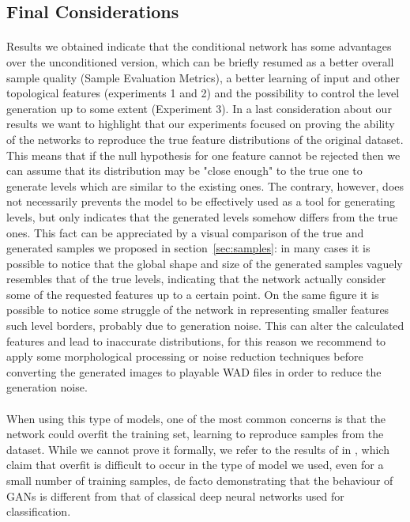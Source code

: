  
\subsection{Final Considerations}
\paragraph{} Results we obtained indicate that the conditional network has some advantages over the unconditioned version, which can be briefly resumed as a better overall sample quality (Sample Evaluation Metrics), a better learning of input and other topological features (experiments 1 and 2) and the possibility to control the level generation up to some extent (Experiment 3). In a last consideration about our results we want to highlight that our experiments focused on proving the ability of the networks to reproduce the true feature distributions of the original dataset. This means that if the null hypothesis for one feature cannot be rejected then we can assume that its distribution may be "close enough" to the true one to generate levels which are similar to the existing ones. The contrary, however, does not necessarily prevents the model to be effectively used as a tool for generating levels, but only indicates that the generated levels somehow differs from the true ones. This fact can be appreciated by a visual comparison of the true and generated samples we proposed in section~\ref{sec:samples}: in many cases it is possible to notice that the global shape and size of the generated samples vaguely resembles that of the true levels, indicating that the network actually consider some of the requested features up to a certain point. On the same figure it is possible to notice some struggle of the network in representing smaller features such level borders, probably due to generation noise. This can alter the calculated features and lead to inaccurate distributions, for this reason we recommend to apply some morphological processing or noise reduction techniques before converting the generated images to playable WAD files in order to reduce the generation noise.

\paragraph{} When using this type of models, one of the most common concerns is that the network could overfit the training set, learning to reproduce samples from the dataset. While we cannot prove it formally, we refer to the results of \citeauthor{empiricalevaluation} in \cite[Appendix~C]{empiricalevaluation}, which claim that overfit is difficult to occur in the type of model we used, even for a small number of training samples, de facto demonstrating that the behaviour of GANs is different from that of classical deep neural networks used for classification.


